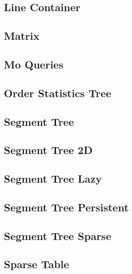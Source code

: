 \subsection{Line Container}
\raggedbottom
\hrulefill
\subsection{Matrix}
\raggedbottom
\hrulefill
\subsection{Mo Queries}
\raggedbottom
\hrulefill
\subsection{Order Statistics Tree}
\raggedbottom
\hrulefill
\subsection{Segment Tree}
\raggedbottom
\hrulefill
\subsection{Segment Tree 2D}
\raggedbottom
\hrulefill
\subsection{Segment Tree Lazy}
\raggedbottom
\hrulefill
\subsection{Segment Tree Persistent}
\raggedbottom
\hrulefill
\subsection{Segment Tree Sparse}
\raggedbottom
\hrulefill
\subsection{Sparse Table}
\raggedbottom
\hrulefill
